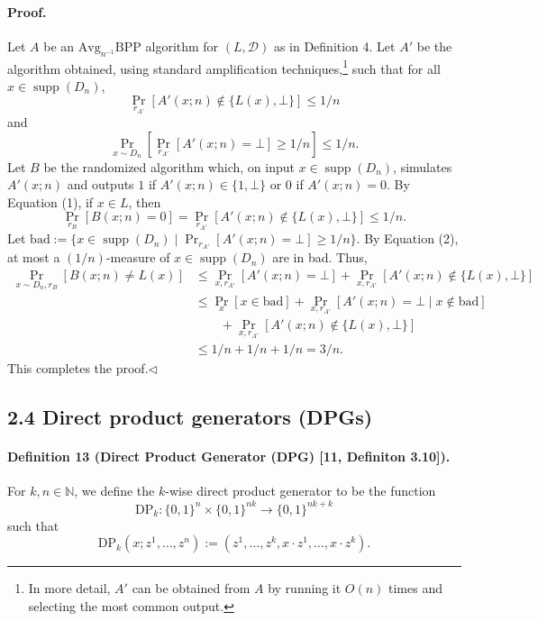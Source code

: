 \paragraph{Proof.} Let $A$ be an $\mathrm{Avg}_{n^{-1}}\mathrm{BPP}$ algorithm for $(L,\mathcal D)$ as in Definition 4. Let $A'$ be the algorithm obtained, using standard amplification techniques,\footnote{In more detail, $A'$ can be obtained from $A$ by running it $O(n)$ times and selecting the most common output.} such that for all $x\in\operatorname{supp}(D_n)$,
\[\Pr_{r_{A'}}[A'(x;n)\notin\{L(x),\bot\}]\leq1/n\tag{1}\]
and
\[\Pr_{x\sim D_n}\left[\Pr_{r_{A'}}[A'(x;n)=\bot]\geq1/n\right]\leq1/n.\tag{2}\]
Let $B$ be the randomized algorithm which, on input $x\in\operatorname{supp}(D_n)$, simulates $A'(x;n)$ and outputs $1$ if $A'(x;n)\in\{1,\bot\}$ or $0$ if $A'(x;n)=0$. By Equation (1), if $x\in L$, then
\[\Pr_{r_B}[B(x;n)=0]=\Pr_{r_{A'}}[A'(x;n)\notin\{L(x),\bot\}]\leq1/n.\]
Let $\mathrm{bad}:=\{x\in\operatorname{supp}(D_n)\mid\Pr_{r_{A'}}[A'(x;n)=\bot]\geq1/n\}$. By Equation (2), at most a $(1/n)$-measure of $x\in\operatorname{supp}(D_n)$ are in bad. Thus,
\begin{align*}
\Pr_{x\sim D_n,r_B}[B(x;n)\neq L(x)]
&\leq\Pr_{x,r_{A'}}[A'(x;n)=\bot]+\Pr_{x,r_{A'}}[A'(x;n)\notin\{L(x),\bot\}]\\
&\leq\Pr_x[x\in\mathrm{bad}]+\Pr_{x,r_{A'}}[A'(x;n)=\bot\mid x\notin\mathrm{bad}]\\
&\qquad+\Pr_{x,r_{A'}}[A'(x;n)\notin\{L(x),\bot\}]\\
&\leq1/n+1/n+1/n=3/n.
\end{align*}
This completes the proof.\hfill$\triangleleft$
\subsection*{2.4 Direct product generators (DPGs)}
\paragraph{Definition 13 (Direct Product Generator (DPG) [11, Definiton 3.10]).} For $k,n\in\mathbb N$, we define the $k$-wise direct product generator to be the function
\[\mathrm{DP}_k:\{0,1\}^n\times\{0,1\}^{nk}\to\{0,1\}^{nk+k}\]
such that
\[\mathrm{DP}_k(x;z^1,\ldots,z^n):=(z^1,\ldots,z^k,x\cdot z^1,\ldots,x\cdot z^k).\]
